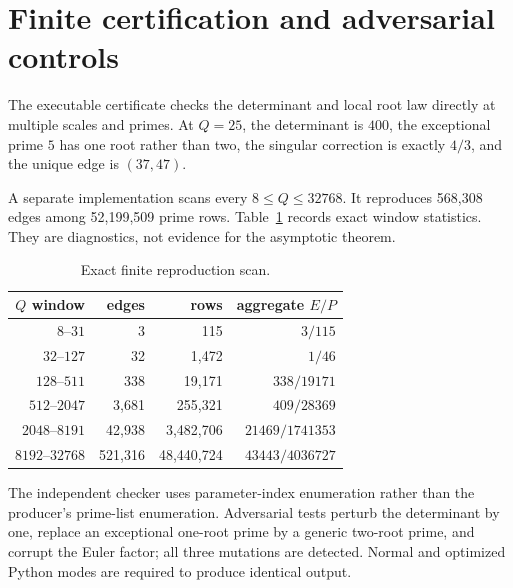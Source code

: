 \section{Finite certification and adversarial controls}

The executable certificate checks the determinant and local root law directly at
multiple scales and primes.  At $Q=25$, the determinant is $400$, the exceptional
prime $5$ has one root rather than two, the singular correction is exactly $4/3$, and
the unique edge is $(37,47)$.

A separate implementation scans every $8\le Q\le32768$.  It reproduces 568,308 edges
among 52,199,509 prime rows.  Table~\ref{tab:scan} records exact window statistics.
They are diagnostics, not evidence for the asymptotic theorem.

\begin{table}[ht]
\centering
\small
\begin{tabular}{rrrr}
\toprule
$Q$ window & edges & rows & aggregate $E/P$ \\
\midrule
$8$--$31$ & 3 & 115 & $3/115$ \\
$32$--$127$ & 32 & 1,472 & $1/46$ \\
$128$--$511$ & 338 & 19,171 & $338/19171$ \\
$512$--$2047$ & 3,681 & 255,321 & $409/28369$ \\
$2048$--$8191$ & 42,938 & 3,482,706 & $21469/1741353$ \\
$8192$--$32768$ & 521,316 & 48,440,724 & $43443/4036727$ \\
\bottomrule
\end{tabular}
\caption{Exact finite reproduction scan.}
\label{tab:scan}
\end{table}

The independent checker uses parameter-index enumeration rather than the producer's
prime-list enumeration.  Adversarial tests perturb the determinant by one, replace an
exceptional one-root prime by a generic two-root prime, and corrupt the Euler factor;
all three mutations are detected.  Normal and optimized Python modes are required to
produce identical output.
